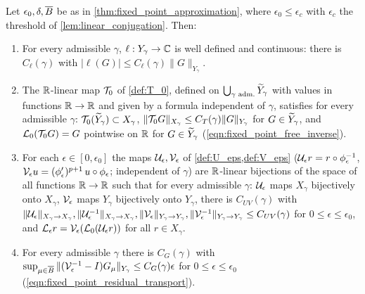 \begin{lemma}
  \label{lem:linear_inverse_assembly}
  Let $\epsilon_0,\delta,\overline{B}$ be as in \cref{thm:fixed_point_approximation}, where $\epsilon_0\le\epsilon_c$ with
  $\epsilon_c$ the threshold of \cref{lem:linear_conjugation}. Then:
  \begin{enumerate}
    \item For every admissible $\gamma$, $\ell:Y_\gamma\to\mathbb{C}$ is well defined and continuous: there is $C_\ell(\gamma)$ with $|\ell(G)|\le C_\ell(\gamma)\|G\|_{Y_\gamma}$.
    \item The $\mathbb{R}$-linear map $\mathcal{T}_0$ of \cref{def:T_0}, defined on $\bigcup_{\gamma\text{ adm.}}\widetilde{Y}_\gamma$ with values in functions $\mathbb{R}\to\mathbb{R}$ and given by a formula
      independent of $\gamma$, satisfies for every admissible $\gamma$: $\mathcal{T}_0(\widetilde{Y}_\gamma)\subset X_\gamma$, $\|\mathcal{T}_0G\|_{X_\gamma}\le C_T(\gamma)\|G\|_{Y_\gamma}$ for $G\in\widetilde{Y}_\gamma$, and
      $\mathcal{L}_0(\mathcal{T}_0G)=G$ pointwise on $\mathbb{R}$ for $G\in\widetilde{Y}_\gamma$ (\eqref{eqn:fixed_point_free_inverse}).
    \item For each $\epsilon\in[0,\epsilon_0]$ the maps $\mathcal{U}_\epsilon,\mathcal{V}_\epsilon$ of \cref{def:U_eps,def:V_eps} ($\mathcal{U}_\epsilon r=r\circ\phi_\epsilon^{-1}$,
      $\mathcal{V}_\epsilon u=(\phi_\epsilon')^{p+1}\,u\circ\phi_\epsilon$; independent of $\gamma$) are $\mathbb{R}$-linear bijections of the space of all functions $\mathbb{R}\to\mathbb{R}$ such that for every
      admissible $\gamma$: $\mathcal{U}_\epsilon$ maps $X_\gamma$ bijectively onto $X_\gamma$, $\mathcal{V}_\epsilon$ maps $Y_\gamma$ bijectively onto $Y_\gamma$, there is $C_{UV}(\gamma)$ with
      $\|\mathcal{U}_\epsilon\|_{X_\gamma\to X_\gamma},\|\mathcal{U}^{-1}_\epsilon\|_{X_\gamma\to X_\gamma},\|\mathcal{V}_\epsilon\|_{Y_\gamma\to Y_\gamma},\|\mathcal{V}_\epsilon^{-1}\|_{Y_\gamma\to Y_\gamma}\le C_{UV}(\gamma)$ for $0\le\epsilon\le\epsilon_0$,
      and $\mathcal{L}_\epsilon r=\mathcal{V}_\epsilon(\mathcal{L}_0(\mathcal{U}_\epsilon r))$ for all $r\in X_\gamma$.
    \item For every admissible $\gamma$ there is $C_G(\gamma)$ with $\sup_{\mu\in\overline{B}}\|(\mathcal{V}_\epsilon^{-1}-I)G_\mu\|_{Y_\gamma}\le C_G(\gamma)\epsilon$ for $0\le\epsilon\le\epsilon_0$
      (\eqref{eqn:fixed_point_residual_transport}).
  \end{enumerate}
\end{lemma}
